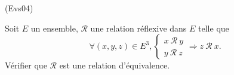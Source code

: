 \begin{tiny}(Evs04)\end{tiny} Soit $E$ un ensemble, $\mathcal{R}$ une relation r{\'e}flexive dans $E
$ telle que
\[
\forall (x,y,z)\in E^{3},\left\{
\begin{array}{c}
x\ \mathcal{R\ }y \\
y\ \mathcal{R\ }z
\end{array}
\right. \Rightarrow z\ \mathcal{R\ }x\text{.}
\]
V{\'e}rifier que $\mathcal{R}$ est une relation d'{\'e}quivalence.
